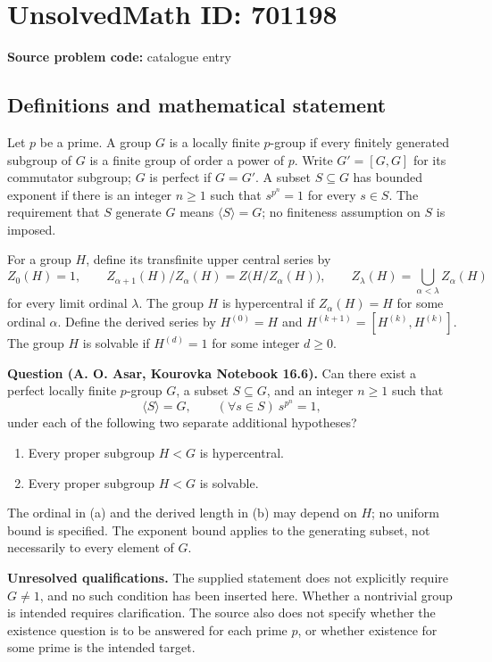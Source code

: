 \documentclass[11pt]{article}
\begin{document}
\section*{UnsolvedMath ID: 701198}
\textbf{Source problem code:} catalogue entry
\subsection{Definitions and mathematical statement}
Let \(p\) be a prime. A group \(G\) is a locally finite \(p\)-group if every finitely generated subgroup of \(G\) is a finite group of order a power of \(p\). Write \(G'=[G,G]\) for its commutator subgroup; \(G\) is perfect if \(G=G'\). A subset \(S\subseteq G\) has bounded exponent if there is an integer \(n\geq 1\) such that \(s^{p^n}=1\) for every \(s\in S\). The requirement that \(S\) generate \(G\) means \(\langle S\rangle=G\); no finiteness assumption on \(S\) is imposed.

For a group \(H\), define its transfinite upper central series by
\[
Z_0(H)=1,\qquad Z_{\alpha+1}(H)/Z_\alpha(H)=Z\bigl(H/Z_\alpha(H)\bigr),\qquad
Z_\lambda(H)=\bigcup_{\alpha<\lambda}Z_\alpha(H)
\]
for every limit ordinal \(\lambda\). The group \(H\) is hypercentral if \(Z_\alpha(H)=H\) for some ordinal \(\alpha\). Define the derived series by \(H^{(0)}=H\) and \(H^{(k+1)}=[H^{(k)},H^{(k)}]\). The group \(H\) is solvable if \(H^{(d)}=1\) for some integer \(d\geq 0\).

\textbf{Question (A. O. Asar, Kourovka Notebook 16.6).} Can there exist a perfect locally finite \(p\)-group \(G\), a subset \(S\subseteq G\), and an integer \(n\geq 1\) such that
\[
\langle S\rangle=G,\qquad (\forall s\in S)\ s^{p^n}=1,
\]
under each of the following two separate additional hypotheses?
\begin{enumerate}
\item[(a)] Every proper subgroup \(H<G\) is hypercentral.
\item[(b)] Every proper subgroup \(H<G\) is solvable.
\end{enumerate}
The ordinal in (a) and the derived length in (b) may depend on \(H\); no uniform bound is specified. The exponent bound applies to the generating subset, not necessarily to every element of \(G\).

\textbf{Unresolved qualifications.} The supplied statement does not explicitly require \(G\neq 1\), and no such condition has been inserted here. Whether a nontrivial group is intended requires clarification. The source also does not specify whether the existence question is to be answered for each prime \(p\), or whether existence for some prime is the intended target.
\end{document}
